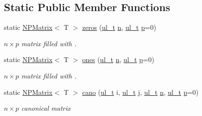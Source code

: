 \subsection*{Static Public Member Functions}
\begin{DoxyCompactItemize}
\item 
static \mbox{\hyperlink{class_n_p_matrix}{N\+P\+Matrix}}$<$ T $>$ \mbox{\hyperlink{class_n_p_matrix_a701c8f60b4b8b727fccb063cd6f0784b}{zeros}} (\mbox{\hyperlink{group___n_algebra_ga1b140a2034db3f5dfe18a987745df43a}{ul\+\_\+t}} \mbox{\hyperlink{class_n_p_matrix_afc181b7652d9427125c72c38d7c1498d}{n}}, \mbox{\hyperlink{group___n_algebra_ga1b140a2034db3f5dfe18a987745df43a}{ul\+\_\+t}} \mbox{\hyperlink{class_n_p_matrix_a3beee8acb5babf62d2b4f212ac5d18e8}{p}}=0)
\begin{DoxyCompactList}\small\item\em $ n \times p $ matrix filled with {}. \end{DoxyCompactList}\item 
static \mbox{\hyperlink{class_n_p_matrix}{N\+P\+Matrix}}$<$ T $>$ \mbox{\hyperlink{class_n_p_matrix_a6509ca1d29b8b87f2d437883f48a40c9}{ones}} (\mbox{\hyperlink{group___n_algebra_ga1b140a2034db3f5dfe18a987745df43a}{ul\+\_\+t}} \mbox{\hyperlink{class_n_p_matrix_afc181b7652d9427125c72c38d7c1498d}{n}}, \mbox{\hyperlink{group___n_algebra_ga1b140a2034db3f5dfe18a987745df43a}{ul\+\_\+t}} \mbox{\hyperlink{class_n_p_matrix_a3beee8acb5babf62d2b4f212ac5d18e8}{p}}=0)
\begin{DoxyCompactList}\small\item\em $ n \times p $ matrix filled with {}. \end{DoxyCompactList}\item 
static \mbox{\hyperlink{class_n_p_matrix}{N\+P\+Matrix}}$<$ T $>$ \mbox{\hyperlink{class_n_p_matrix_ab0b53ef59fa95ac9a0a2a3214c4845e5}{cano}} (\mbox{\hyperlink{group___n_algebra_ga1b140a2034db3f5dfe18a987745df43a}{ul\+\_\+t}} i, \mbox{\hyperlink{group___n_algebra_ga1b140a2034db3f5dfe18a987745df43a}{ul\+\_\+t}} j, \mbox{\hyperlink{group___n_algebra_ga1b140a2034db3f5dfe18a987745df43a}{ul\+\_\+t}} \mbox{\hyperlink{class_n_p_matrix_afc181b7652d9427125c72c38d7c1498d}{n}}, \mbox{\hyperlink{group___n_algebra_ga1b140a2034db3f5dfe18a987745df43a}{ul\+\_\+t}} \mbox{\hyperlink{class_n_p_matrix_a3beee8acb5babf62d2b4f212ac5d18e8}{p}}=0)
\begin{DoxyCompactList}\small\item\em $ n \times p $ canonical matrix \end{DoxyCompactList}\item 

\end{DoxyCompactItemize}
